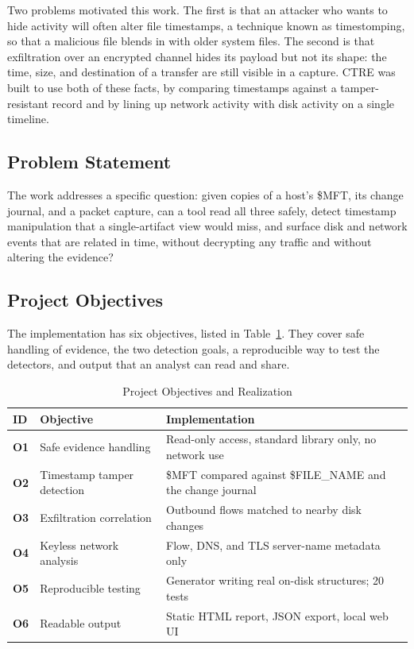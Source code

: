 \documentclass[12pt,onecolumn]{IEEEtran}
\begin{document}
Two problems motivated this work. The first is that an attacker who wants to hide activity will often alter file timestamps, a technique known as timestomping, so that a malicious file blends in with older system files. The second is that exfiltration over an encrypted channel hides its payload but not its shape: the time, size, and destination of a transfer are still visible in a capture. CTRE was built to use both of these facts, by comparing timestamps against a tamper-resistant record and by lining up network activity with disk activity on a single timeline.

\subsection{Problem Statement}
The work addresses a specific question: given copies of a host's \$MFT, its change journal, and a packet capture, can a tool read all three safely, detect timestamp manipulation that a single-artifact view would miss, and surface disk and network events that are related in time, without decrypting any traffic and without altering the evidence?

\subsection{Project Objectives}
The implementation has six objectives, listed in Table~\ref{tab:objectives}. They cover safe handling of evidence, the two detection goals, a reproducible way to test the detectors, and output that an analyst can read and share.

\begin{table}[htbp]
\centering
\caption{Project Objectives and Realization}
\label{tab:objectives}
\begin{tabular}{>{\bfseries}p{}
                p{}
                p{}}
\toprule
ID & Objective & Implementation \\
\midrule
O1 & Safe evidence handling          & Read-only access, standard library only, no network use \\
O2 & Timestamp tamper detection      & \$MFT compared against \$FILE\_NAME and the change journal \\
O3 & Exfiltration correlation        & Outbound flows matched to nearby disk changes \\
O4 & Keyless network analysis        & Flow, DNS, and TLS server-name metadata only \\
O5 & Reproducible testing            & Generator writing real on-disk structures; 20 tests \\
O6 & Readable output                 & Static HTML report, JSON export, local web UI \\
\bottomrule
\end{tabular}
\end{table}
\end{document}
